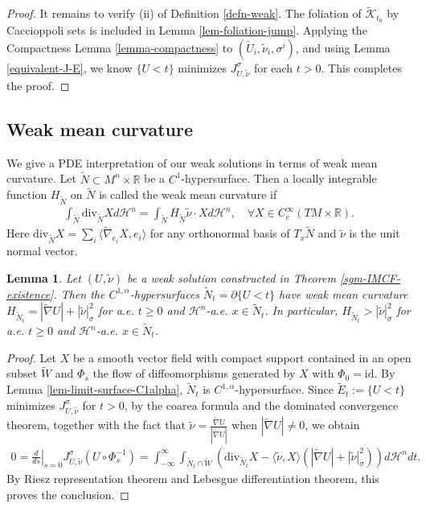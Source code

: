\documentclass[11pt, letterpaper]{amsart}
\newtheorem{lem}[thm]{Lemma}
\theoremstyle{definition}
\theoremstyle{remark}
\begin{document}
\begin{proof}
	It remains to verify (ii) of Definition \ref{defn-weak}. The foliation of $\tilde{\mathcal{K}}_{t_0}$ by Caccioppoli sets is included in Lemma \ref{lem-foliation-jump}. Applying the Compactness Lemma \ref{lemma-compactness} to $(\tilde{U}_i, \tilde{\nu }_i, \sigma ^{i})$, and using Lemma \ref{equivalent-J-E}, we know $\{U< t\} $ minimizes $J^{\sigma }_{U, \tilde{\nu }}$ for each $t>0$. This completes the proof.
\end{proof}


\subsection{Weak mean curvature} We give a PDE interpretation of our weak solutions in terms of weak mean curvature. Let $\tilde{N} \subset M ^{n} \times \mathbb{R}$ be a $C^1$-hypersurface. Then a locally integrable function $H_{\tilde{N}}$
 on $\tilde{N}$ is called the weak mean curvature if 
\begin{align*}
 \int_{\tilde{N}} \mathrm{div}_{\tilde{N}} X d \mathcal{H}^{n}= \int_{\tilde{N}} H_{\tilde{N}} \tilde{\nu }\cdot X d \mathcal{H}^{n},\quad \forall X \in C^{\infty}_{c}(TM \times \mathbb{R}).	
\end{align*} 
Here  $\mathrm{div}_{\tilde{N}} X = \sum_{i}^{} \langle \tilde{\nabla }_{e_i} X, e_i  \rangle $ for any orthonormal basis of $T_{x}\tilde{N}$ and $\tilde{\nu }$ is the unit normal vector.

\begin{lem}\label{lem-weak-mean-curvature}
	Let $(U, \tilde{\nu })$ be a weak solution constructed in Theorem \ref{sgm-IMCF-existence}. Then the $C^{1,\alpha }$-hypersurfaces $\tilde{N}_t = \partial \{ U < t\} $ have weak mean curvature $H_{\tilde{N}_t} = |\tilde{\nabla }U| + |\tilde{\nu }|^2_{\sigma }$ for a.e. $t \geq 0$ and $\mathcal{H}^{n}$-a.e. $x \in \tilde{N}_{t}$. In particular, $H_{\tilde{N}_t} > |\tilde{\nu }|^2_{\sigma }$ for a.e. $t \geq 0$ and $\mathcal{H}^{n}$-a.e. $x \in \tilde{N}_{t}$.
\end{lem}
\begin{proof}
	 Let $X$ be a smooth vector field with compact support contained in an open subset $\tilde{W}$ and $\Phi _{s}$ the flow of diffeomorphisms generated by $X$ with $\Phi _{0}= \mathrm{id}$. By Lemma \ref{lem-limit-surface-C1alpha}, $\tilde{N}_{t}$ is $C^{1,\alpha }$-hypersurface. Since $\tilde{E}_t:= \{ U< t\} $ minimizes $J^{\sigma }_{U, \tilde{\nu }}$ for $t>0$, by the coarea formula and the dominated convergence theorem, together with the fact that $\tilde{\nu }= \frac{\tilde{\nabla }U}{|\tilde{\nabla }U|}$ when $|\tilde{\nabla }U| \neq 0$, we obtain 
	 \begin{align*}
	 	0 = \left.\frac{d}{d s}\right|_{s=0} J^{\sigma }_{U, \tilde{\nu }}(U\circ \Phi _s^{-1}) = \int_{-\infty}^{\infty} \int_{\tilde{N}_{t} \cap \tilde{W}} \left( \mathrm{div}_{\tilde{N}_t}X -  \langle \tilde{\nu }, X  \rangle  (|\tilde{\nabla }U| + |\tilde{\nu }|^2_{\sigma }) \right)  d \mathcal{H}^{n} dt.
	 \end{align*} 
By Riesz representation theorem and Lebesgue differentiation theorem, this proves the conclusion.
\end{proof}
\end{document}
